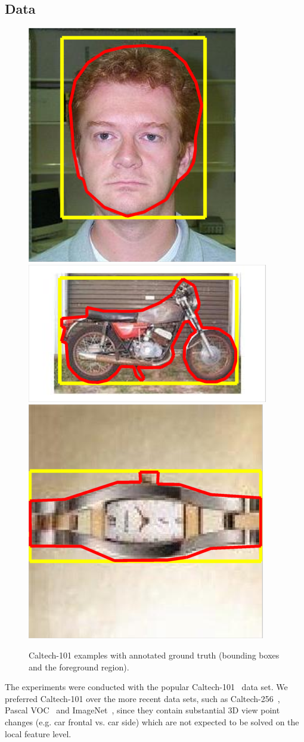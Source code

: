 \documentclass[journal]{IEEEtran}
\begin{document}
%
\subsection{Data\label{sec:data}}
%
%
\begin{figure}[h]
\begin{center}
  \includegraphics[width=0.25\linewidth]{resources/caltech-101_face_example.png}
  \includegraphics[width=0.4\linewidth]{resources/caltech-101_motorbikes_example.png}
  \includegraphics[width=0.25\linewidth]{resources/caltech-101_watch_example.png}\\
  \caption{Caltech-101 examples with annotated ground truth (bounding boxes and the foreground region).}
  \label{fig:caltech}
  \end{center}
\end{figure}
%
The experiments were conducted with the popular Caltech-101~\cite{FeiFerPer:2006} data
set. We preferred Caltech-101 over the more recent data sets, such as
Caltech-256~\cite{Caltech256}, Pascal VOC~\cite{EveGooWil:2010} and
ImageNet~\cite{imagenet}, since they contain substantial 3D view point changes
(e.g. car frontal vs. car side) which are not expected to be solved
on the local feature level.
\end{document}
